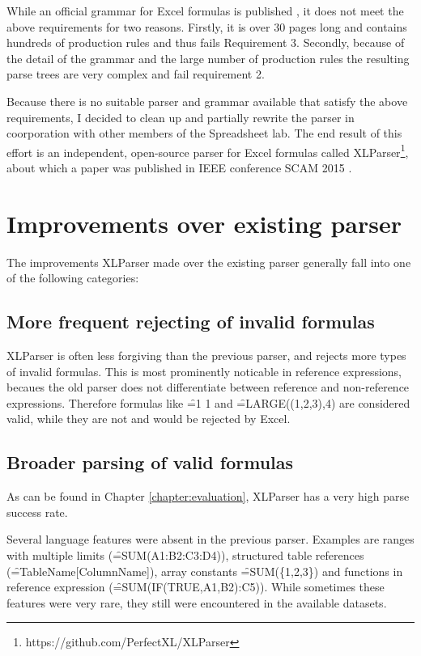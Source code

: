 While an official grammar for Excel formulas is published \cite{ExcelOfficialGrammar}, it does not meet the above requirements for two reasons.
Firstly, it is over 30 pages long and contains hundreds of production rules and thus fails Requirement 3.
Secondly, because of the detail of the grammar and the large number of production rules the resulting parse trees are very complex and fail requirement 2.

Because there is no suitable parser and grammar available that satisfy the above requirements, I decided to clean up and partially rewrite the parser in coorporation with other members of the Spreadsheet lab.
The end result of this effort is an independent, open-source parser for Excel formulas called XLParser\footnote{https://github.com/PerfectXL/XLParser}, about which a paper was published in IEEE conference SCAM 2015 \cite{xlparser}.

\section{Improvements over existing parser}

The improvements XLParser made over the existing parser generally fall into one of the following categories:

\subsection{More frequent rejecting of invalid formulas}

XLParser is often less forgiving than the previous parser, and rejects more types of invalid formulas.
This is most prominently noticable in reference expressions, becaues the old parser does not differentiate between reference and non-reference expressions.
Therefore formulas like \f{=1 1} and \f{=LARGE((1,2,3),4)} are considered valid, while they are not and would be rejected by Excel.

\subsection{Broader parsing of valid formulas}

As can be found in Chapter \ref{chapter:evaluation}, XLParser has a very high parse success rate.

Several language features were absent in the previous parser.
Examples are ranges with multiple limits (\f{=SUM(A1:B2:C3:D4)}), structured table references (\f{=TableName[ColumnName]}), array constants \f{=SUM(\{1,2,3\})} and functions in reference expression (\f{=SUM(IF(TRUE,A1,B2):C5)}).
While sometimes these features were very rare, they still were encountered in the available datasets.

